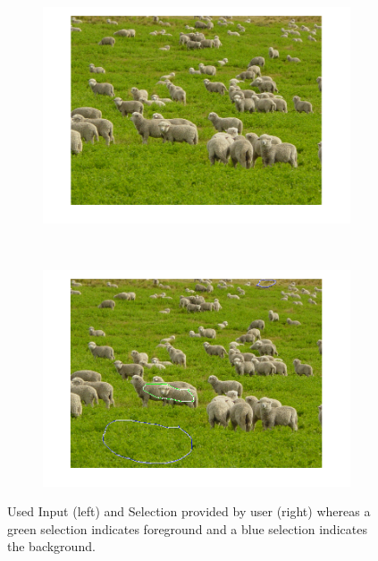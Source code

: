 \documentclass{paper}
\begin{document}
\begin{figure}[H]
    \centering
    \begin{subfigure}{0.45\textwidth}
        \includegraphics[width=\textwidth]{../../outputs/p4/image_segmentation/sheeps/input}
    \end{subfigure}
    ~
        \begin{subfigure}{0.45\textwidth}
        \includegraphics[width=\textwidth]{../../outputs/p4/image_segmentation/sheeps/selection}
    \end{subfigure}
    
    \caption{Used Input (left) and Selection provided by user (right) whereas a green selection indicates foreground and a blue selection indicates the background.}
    \label{fig:segmentation_sheeps_input_selection}       
\end{figure}
\end{document}
